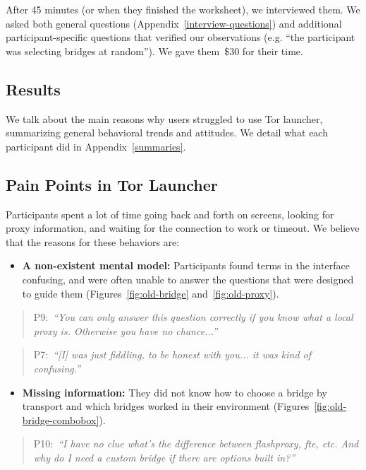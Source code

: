 \documentclass[USenglish,oneside,twocolumn]{article}
\newcommand{\pquote}[2]{
\begin{quotation}
\noindent #1:~\textit{#2}
\end{quotation}
}
\begin{document}
After 45 minutes (or when they finished the worksheet), we interviewed them. We asked both general questions (Appendix~\ref{interview-questions}) and additional participant-specific questions that verified our observations (e.g. ``the participant was selecting bridges at random''). We gave them~\$30 for their time. 

\subsection{Results} 

We talk about the main reasons why users struggled to use Tor launcher, summarizing general behavioral trends and attitudes. We detail what each participant did in Appendix~\ref{summaries}. 

\subsection{Pain Points in Tor Launcher} 
\label{sec:pain-points}
Participants spent a lot of time going back and forth on screens, looking for proxy information, and waiting for the connection to work or timeout. We believe that the reasons for these behaviors are:\\

\begin{itemize}
\item {\bfseries A non-existent mental model:} Participants found terms in the interface confusing, and were often unable to answer the questions that were designed to guide them (Figures~\ref{fig:old-bridge} and~\ref{fig:old-proxy}).
\end{itemize} 

\pquote{P9}{``You can only answer this question correctly if you know what a local proxy is.
Otherwise you have no chance...''}

\pquote{P7}{``[I] was just fiddling, to be honest with you... it was kind of confusing.''}

\begin{itemize}
\item {\bfseries Missing information:} They did not know how to choose a bridge by transport and which bridges worked in their environment (Figures~\ref{fig:old-bridge-combobox}).
\end{itemize} 

\pquote{P10}{``I have no clue what's the difference between flashproxy, fte, etc. And why do I need a custom bridge if there are options built in?''}
\end{document}
